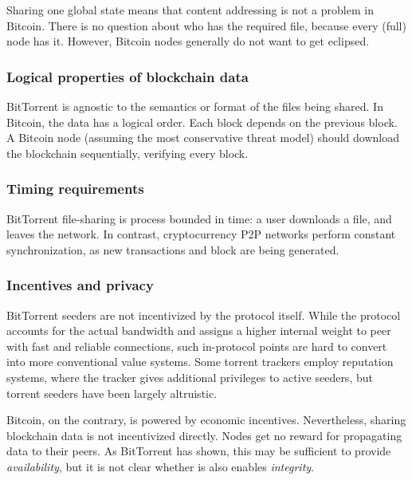 Sharing one global state means that content addressing is not a problem in Bitcoin.
There is no question about who has the required file, because every (full) node has it.
However, Bitcoin nodes generally do not want to get eclipsed.





\subsubsection{Logical properties of blockchain data}

BitTorrent is agnostic to the semantics or format of the files being shared.
In Bitcoin, the data has a logical order.
Each block depends on the previous block.
A Bitcoin node (assuming the most conservative threat model) should download the blockchain sequentially, verifying every block.


\subsubsection{Timing requirements}

BitTorrent file-sharing is process bounded in time: a user downloads a file, and leaves the network.
In contrast, cryptocurrency P2P networks perform constant synchronization, as new transactions and block are being generated.



\subsubsection{Incentives and privacy}

BitTorrent seeders are not incentivized by the protocol itself.
While the protocol accounts for the actual bandwidth and assigns a higher internal weight to peer with fast and reliable connections, such in-protocol points are hard to convert into more conventional value systems.
Some torrent trackers employ reputation systems, where the tracker gives additional privileges to active seeders, but torrent seeders have been largely altruistic.

Bitcoin, on the contrary, is powered by economic incentives.
Nevertheless, sharing blockchain data is not incentivized directly.
Nodes get no reward for propagating data to their peers.
As BitTorrent has shown, this may be sufficient to provide \textit{availability}, but it is not clear whether is also enables \textit{integrity}.

